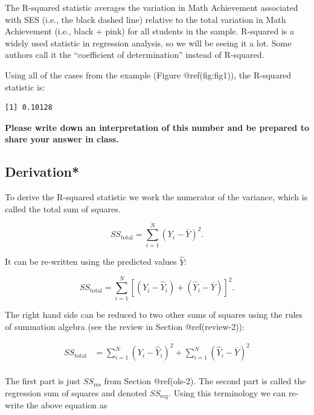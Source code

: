 \documentclass[
  letterpaper,
  DIV=11,
  numbers=noendperiod]{scrreprt}
\newenvironment{Shaded}{\begin{snugshade}}{\end{snugshade}}
\newcommand{\AttributeTok}[1]{\textcolor[rgb]{0.40,0.45,0.13}{#1}}
\newcommand{\DecValTok}[1]{\textcolor[rgb]{0.68,0.00,0.00}{#1}}
\newcommand{\FunctionTok}[1]{\textcolor[rgb]{0.28,0.35,0.67}{#1}}
\newcommand{\NormalTok}[1]{\textcolor[rgb]{0.00,0.23,0.31}{#1}}
\newcommand{\SpecialCharTok}[1]{\textcolor[rgb]{0.37,0.37,0.37}{#1}}
\begin{document}
The R-squared statistic averages the variation in Math Achievement
associated with SES (i.e., the black dashed line) relative to the total
variation in Math Achievement (i.e., black + pink) for all students in
the sample. R-squared is a widely used statistic in regression analysis,
so we will be seeing it a lot. Some authors call it the ``coefficient of
determination'' instead of R-squared.

Using all of the cases from the example (Figure @ref(fig:fig1)), the
R-squared statistic is:

\begin{Shaded}
\end{Shaded}

\begin{verbatim}
[1] 0.10128
\end{verbatim}

\textbf{Please write down an interpretation of this number and be
prepared to share your answer in class.}

\hypertarget{derivation}{%
\subsection{Derivation*}\label{derivation}}

To derive the R-squared statistic we work the numerator of the variance,
which is called the total sum of squares.

\[SS_{\text{total}} = \sum_{i = 1}^N (Y_i - \bar Y)^2. \]

It can be re-written using the predicted values \(\widehat Y\):

\[SS_{\text{total}} = \sum_{i = 1}^N [(Y_i - \widehat Y_i) + (\widehat Y_i - \bar Y)]^2. \]

The right hand side can be reduced to two other sums of squares using
the rules of summation algebra (see the review in Section
@ref(review-2)):

\begin{align} 
SS_{\text{total}} & = \sum_{i = 1}^N (Y_i - \widehat Y_i)^2 + \sum_{i = 1}^N (\widehat Y_i - \bar Y)^2 \\
\end{align}

The first part is just \(SS_\text{res}\) from Section @ref(ols-2). The
second part is called the regression sum of squares and denoted
\(SS_\text{reg}\). Using this terminology we can re-write the above
equation as
\end{document}
